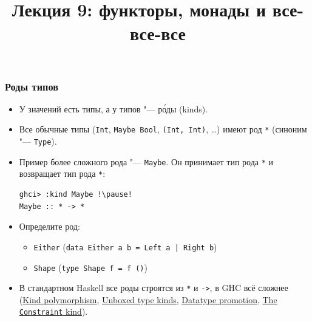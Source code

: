 \documentclass[11pt]{beamer}
\title{Лекция 9: функторы, монады и все-все-все}
\begin{document}
\begin{frame}[plain]
  \maketitle
\end{frame}

\begin{frame}[fragile]
  \frametitle{Роды типов}
  \begin{itemize}
    \item У значений есть типы, а у типов "--- р\'{о}ды (kinds).
    \item Все обычные типы (\lstinline|Int|, \lstinline|Maybe Bool|, \lstinline|(Int, Int)|, \ldots) имеют род \lstinline|*| (синоним "--- \lstinline|Type|).
          \pause
    \item Пример более сложного рода "--- \lstinline|Maybe|. Он принимает тип рода \lstinline|*| и возвращает тип рода \lstinline|*|:
          \begin{lstlisting}
ghci> :kind Maybe !\pause!
Maybe :: * -> *
    \end{lstlisting}
          \pause
    \item Определите род:
          \begin{itemize}
            \item \lstinline!Either! (\lstinline!data Either a b = Left a | Right b!)
                  \pause
            \item \lstinline!Shape! (\lstinline|type Shape f = f ()|)
                  \pause
          \end{itemize}
    \item В стандартном Haskell все роды строятся из  \lstinline|*| и \lstinline|->|, в GHC всё сложнее (\href{https://downloads.haskell.org/~ghc/8.6.3/docs/html/users_guide/glasgow_exts.html#kind-polymorphism}{Kind polymorphism}, \href{https://downloads.haskell.org/~ghc/8.6.3/docs/html/users_guide/glasgow_exts.html#unboxed-types-and-primitive-operations}{Unboxed type kinds}, \href{https://downloads.haskell.org/~ghc/8.6.3/docs/html/users_guide/glasgow_exts.html#datatype-promotion}{Datatype promotion},  \href{https://downloads.haskell.org/~ghc/8.6.3/docs/html/users_guide/glasgow_exts.html#the-constraint-kind}{The \lstinline|Constraint| kind}).
  \end{itemize}
\end{frame}
\end{document}
